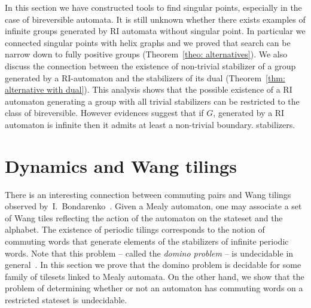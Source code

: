 \documentclass{amsart}
\begin{document}
In this section we have constructed tools to find singular points, especially in the case of bireversible automata. It is still unknown whether there exists examples of infinite groups generated by RI automata without singular point. In particular we connected singular points with helix graphs and we proved that search can be narrow down to fully positive groups (Theorem~\ref{theo: alternatives}). We also discuss the connection between the existence of non-trivial stabilizer of a group generated by a RI-automaton and the stabilizers of its dual (Theorem~\ref{thm: alternative with dual}). This analysis shows that the possible existence of a RI automaton generating a group with all trivial stabilizers can be restricted to the class of bireversible. However evidences suggest  that if $G$, generated by a RI automaton is infinite then it admits at least a non-trivial boundary. stabilizers.

\section{Dynamics and Wang tilings}\label{sec: wang tilings} 
There is an interesting connection between commuting pairs and Wang tilings observed by~I.~Bondarenko~\cite{Bonda-private}. Given a Mealy automaton, one may associate  a set of Wang tiles reflecting the action of the automaton on the stateset and the alphabet. The existence of periodic tilings corresponds to the notion of commuting words that generate elements of the stabilizers of infinite periodic words. Note that this problem -- called the \emph{domino problem} -- is undecidable in general~\cite{berger,KaPa}. In this section we prove that the domino problem is decidable for some family  of tilesets linked to Mealy automata. On the other hand, we show that the problem of determining whether or not an automaton has commuting words on a restricted stateset is undecidable. 
\end{document}
